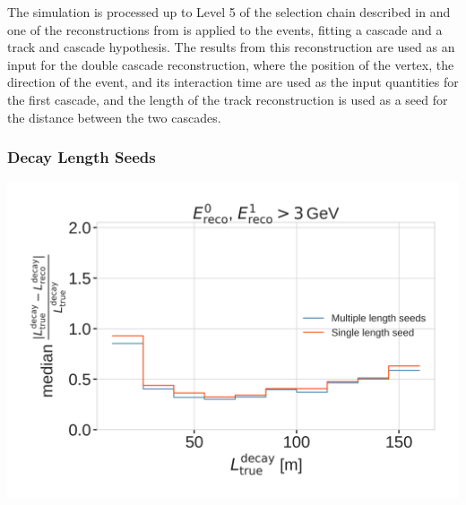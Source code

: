 The simulation is processed up to Level 5 of the selection chain described in  and one of the reconstructions from  is applied to the events, fitting a cascade and a track and cascade hypothesis. The results from this reconstruction are used as an input for the double cascade reconstruction, where the position of the vertex, the direction of the event, and its interaction time are used as the input quantities for the first cascade, and the length of the track reconstruction is used as a seed for the distance between the two cascades.


\subsubsection{Decay Length Seeds}

\begin{marginfigure}
	\centering
    \includegraphics{figures/results/190605_reco_optimization/decay_length_seeding_median_decay_length_resolution_Good + L7 + reco E1,E2 above 3_fix_y.png}
    \caption[Decay length resolutions to optimize length seeding]{Decay length resolution as a function of the true decay length, comparing the same fit routine seeded with just the seed decay length and seeded with a decay length of \SI{5}{\meter}, \SI{25}{\meter}, \SI{50}{\meter}, \SI{100}{\meter}, and \SI{200}{\meter} on the left. Only events that had more than \SI{3}{\gev} in both cascades are used, and the resolutions are unweighted.}
\end{marginfigure}

